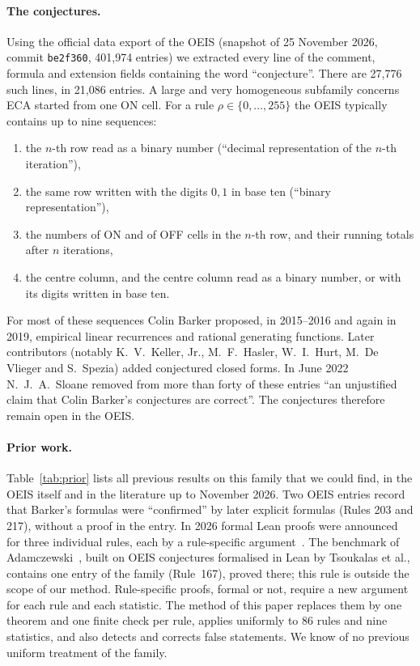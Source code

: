 \documentclass[11pt]{article}
\theoremstyle{definition}
\theoremstyle{remark}
\begin{document}
\paragraph{The conjectures.} Using the official data export of the OEIS (snapshot of 25 November 2026, commit \texttt{be2f360}, 401{,}974 entries) we extracted every line of the comment, formula and extension fields containing the word ``conjecture''. There are 27{,}776 such lines, in 21{,}086 entries. A large and very homogeneous subfamily concerns ECA started from one ON cell. For a rule $\rho\in\{0,\dots,255\}$ the OEIS typically contains up to nine sequences:
\begin{enumerate}
\item the $n$-th row read as a binary number (``decimal representation of the $n$-th iteration''),
\item the same row written with the digits $0,1$ in base ten (``binary representation''),
\item the numbers of ON and of OFF cells in the $n$-th row, and their running totals after $n$ iterations,
\item the centre column, and the centre column read as a binary number, or with its digits written in base ten.
\end{enumerate}
For most of these sequences Colin Barker proposed, in 2015--2016 and again in 2019, empirical linear recurrences and rational generating functions. Later contributors (notably K.~V.~Keller, Jr., M.~F.~Hasler, W.~I.~Hurt, M.~De Vlieger and S.~Spezia) added conjectured closed forms. In June 2022 N.~J.~A.~Sloane removed from more than forty of these entries ``an unjustified claim that Colin Barker's conjectures are correct''. The conjectures therefore remain open in the OEIS.

\paragraph{Prior work.} Table~\ref{tab:prior} lists all previous results on this family that we could find, in the OEIS itself and in the literature up to November 2026. Two OEIS entries record that Barker's formulas were ``confirmed'' by later explicit formulas (Rules 203 and 217), without a proof in the entry. In 2026 formal Lean proofs were announced for three individual rules, each by a rule-specific argument~\cite{omega,omega54,blair}. The benchmark of Adamczewski~\cite{adamczewski}, built on OEIS conjectures formalised in Lean by Tsoukalas et al., contains one entry of the family (Rule~167), proved there; this rule is outside the scope of our method. Rule-specific proofs, formal or not, require a new argument for each rule and each statistic. The method of this paper replaces them by one theorem and one finite check per rule, applies uniformly to 86 rules and nine statistics, and also detects and corrects false statements. We know of no previous uniform treatment of the family.
\end{document}
